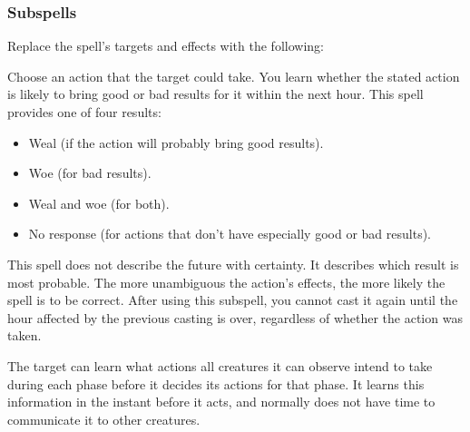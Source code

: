 \subsubsection{Subspells}
Replace the spell's targets and effects with the following:
\begin{spellcontent}
\begin{augmenttargetinginfo}
\end{augmenttargetinginfo}
\begin{augmenteffects}
\spelleffect
Choose an action that the target could take.
You learn whether the stated action is likely to bring good or bad results for it within the next hour.
This spell provides one of four results:
\begin{itemize}
\item Weal (if the action will probably bring good results).
\item Woe (for bad results).
\item Weal and woe (for both).
\item No response (for actions that don't have especially good or bad results).
\end{itemize}
This spell does not describe the future with certainty.
It describes which result is most probable.
The more unambiguous the action's effects, the more likely the spell is to be correct.
After using this subspell, you cannot cast it again until the hour affected by the previous casting is over, regardless of whether the action was taken.
\end{augmenteffects}
\end{spellcontent}
The target can learn what actions all creatures it can observe intend to take during each phase before it decides its actions for that phase.
It learns this information in the instant before it acts, and normally does not have time to communicate it to other creatures.

